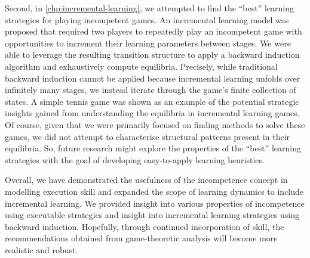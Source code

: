     Second, in \autoref{chp:incremental-learning}, we attempted to find the ``best'' learning strategies for playing incompetent games.
    An incremental learning model was proposed that required two players to repeatedly play an incompetent game with opportunities to increment their learning parameters between stages.
    We were able to leverage the resulting transition structure to apply a backward induction algorithm and exhaustively compute equilibria.
    Precisely, while traditional backward induction cannot be applied because incremental learning unfolds over infinitely many stages, we instead iterate through the game's finite collection of states.
    A simple tennis game was shown as an example of the potential strategic insights gained from understanding the equilibria in incremental learning games.
    Of course, given that we were primarily focused on finding methods to solve these games, we did not attempt to characterise structural patterns present in their equilibria.
    So, future research might explore the properties of the ``best'' learning strategies with the goal of developing easy-to-apply learning heuristics.

    Overall, we have demonstrated the usefulness of the incompetence concept in modelling execution skill and expanded the scope of learning dynamics to include incremental learning.
    We provided insight into various properties of incompetence using executable strategies and insight into incremental learning strategies using backward induction.
    Hopefully, through continued incorporation of skill, the recommendations obtained from game-theoretic analysis will become more realistic and robust.
